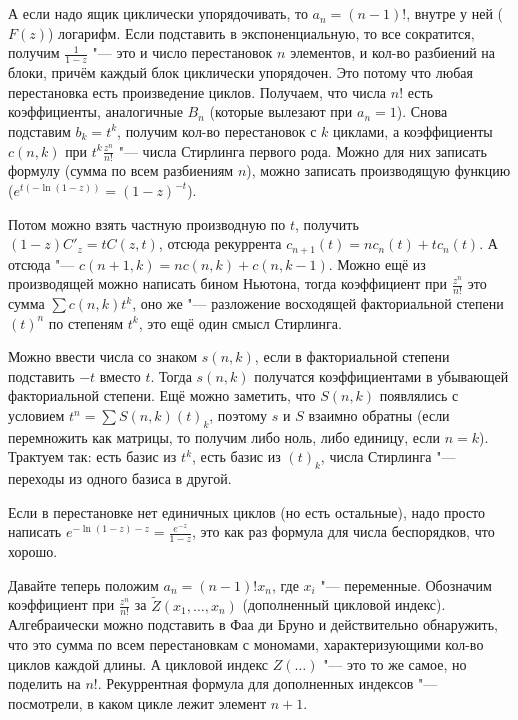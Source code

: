 \section{} %
	А если надо ящик циклически упорядочивать, то $a_n=(n-1)!$, внутре у ней ($F(z)$) логарифм.
	Если подставить в экспоненциальную, то все сократится, получим $\frac{1}{1-z}$ "---
	это и число перестановок $n$ элементов, и кол-во разбиений на блоки, причём каждый блок циклически упорядочен.
	Это потому что любая перестановка есть произведение циклов.
	Получаем, что числа $n!$ есть коэффициенты, аналогичные $B_n$ (которые вылезают при $a_n=1$).
	Снова подставим $b_k=t^k$, получим кол-во перестановок с $k$ циклами,
	а коэффициенты $c(n,k)$ при $t^k\frac{z^n}{n!}$ "--- числа Стирлинга первого рода.
	Можно для них записать формулу (сумма по всем разбиениям $n$),
	можно записать производящую функцию ($e^{t(-\ln(1-z))}=(1-z)^{-t}$).

	Потом можно взять частную производную по $t$, получить $(1-z)C'_z=tC(z, t)$,
	отсюда рекуррента $c_{n+1}(t) = nc_n(t)+tc_n(t)$.
	А отсюда "--- $c(n+1,k)=nc(n,k)+c(n,k-1)$.
	Можно ещё из производящей можно написать бином Ньютона, тогда коэффициент
	при $\frac{z^n}{n!}$ это сумма $\sum c(n,k)t^k$, оно же "--- разложение восходящей
	факториальной степени $(t)^n$ по степеням $t^k$, это ещё один смысл Стирлинга.

	Можно ввести числа со знаком $s(n, k)$, если в факториальной степени
	подставить $-t$ вместо $t$.
	Тогда $s(n, k)$ получатся коэффициентами в убывающей факториальной степени.
	Ещё можно заметить, что $S(n,k)$ появлялись с условием $t^n=\sum S(n, k)(t)_k$,
	поэтому $s$ и $S$ взаимно обратны (если перемножить как матрицы, то получим либо ноль,
	либо единицу, если $n=k$).
	Трактуем так: есть базис из $t^k$, есть базис из $(t)_k$, числа Стирлинга "--- переходы из одного базиса в другой.

	Если в перестановке нет единичных циклов (но есть остальные), надо просто
	написать $e^{-\ln(1-z)-z} = \frac{e^{-z}}{1-z}$, это как раз формула для числа беспорядков, что хорошо.

	Давайте теперь положим $a_n=(n-1)!x_n$, где $x_i$ "--- переменные.
	Обозначим коэффициент при $\frac{z^n}{n!}$ за $\tilde Z(x_1, \dots, x_n)$ (дополненный цикловой индекс).
	Алгебраически можно подставить в Фаа ди Бруно и действительно обнаружить, что
	это сумма по всем перестановкам с мономами, характеризующими кол-во циклов каждой длины.
	А цикловой индекс $Z(\dots)$ "--- это то же самое, но поделить на $n!$.
	Рекуррентная формула для дополненных индексов "--- посмотрели, в каком цикле лежит элемент $n+1$.
